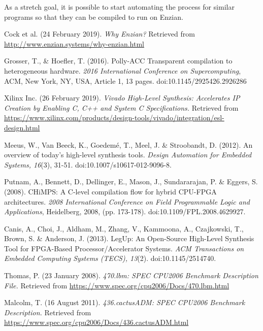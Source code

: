 \documentclass[12pt]{article}
\begin{document}
As a stretch goal, it is possible to start automating the process for similar programs so that they can be compiled to run on Enzian.
\begin{thebibliography}{3}
Cock et al. (24 February 2019). \textit{Why Enzian?}
Retrieved from \url{http://www.enzian.systems/why-enzian.html}

Grosser, T., \& Hoefler, T. (2016). Polly-ACC Transparent compilation to heterogeneous hardware. \textit{2016 International Conference on Supercomputing}, ACM, New York, NY, USA, Article 1, 13 pages. doi:10.1145/2925426.2926286

Xilinx Inc. (26 February 2019). \textit{Vivado High-Level Synthesis: Accelerates IP Creation by Enabling C, C++ and System C Specifications.}
Retrieved from \url{https://www.xilinx.com/products/design-tools/vivado/integration/esl-design.html}

Meeus, W., Van Beeck, K., Goedem{\'e}, T., Meel, J. \& Stroobandt, D. (2012). An overview of today's high-level synthesis tools. \textit{Design Automation for Embedded Systems, 16}(3), 31-51. doi:10.1007/s10617-012-9096-8.

Putnam, A., Bennett, D., Dellinger, E., Mason, J., Sundararajan, P. \& Eggers, S. (2008). CHiMPS: A C-level compilation flow for hybrid CPU-FPGA architectures. \textit{2008 International Conference on Field Programmable Logic and Applications}, Heidelberg, 2008, (pp. 173-178). doi:10.1109/FPL.2008.4629927. 

Canis, A., Choi, J., Aldham, M., Zhang, V., Kammoona, A., Czajkowski, T., Brown, S. \& Anderson, J. (2013). LegUp: An Open-Source High-Level Synthesis Tool for FPGA-Based Processor/Accelerator Systems. \textit{ACM Transactions on Embedded Computing Systems (TECS), 13}(2). doi:10.1145/2514740. 

Thomas, P. (23 January 2008). \textit{470.lbm: SPEC CPU2006 Benchmark Description File.}
Retrieved from \url{https://www.spec.org/cpu2006/Docs/470.lbm.html}

Malcolm, T. (16 August 2011). \textit{436.cactusADM: SPEC CPU2006 Benchmark Description.}
Retrieved from \url{https://www.spec.org/cpu2006/Docs/436.cactusADM.html}

\end{thebibliography}

\newpage
\end{document}
